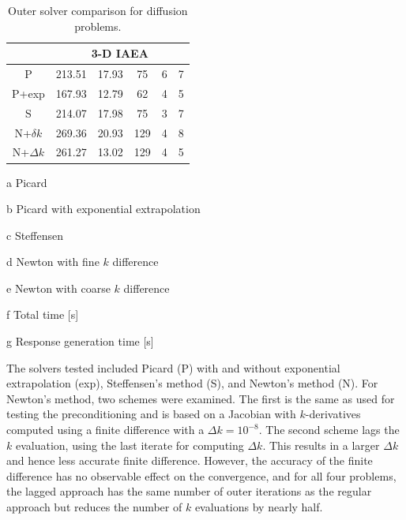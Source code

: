 \begin{table}[!]
\begin{center}
\begin{threeparttable}
\begin{tabular}{cccccc}
 \midrule 
 &  \multicolumn{5}{c}{3-D IAEA} \\ 
 \midrule 
        P &    213.51 &     17.93 &           75 &            6 &            7 \\ 
    P+exp &    167.93 &     12.79 &           62 &            4 &            5 \\ 
    S &    214.07 &     17.98 &           75 &            3 &            7 \\ 
  N+$\delta k$ &    269.36 &     20.93 &          129 &            4 &            8 \\ 
  N+$\Delta k$ &    261.27 &     13.02 &          129 &            4 &            5 \\ 
 \bottomrule 
 \end{tabular} 

 {\footnotesize
 \begin{tablenotes}
   \item[a] Picard 
   \item[b] Picard with exponential extrapolation
   \item[c] Steffensen
   \item[d] Newton with fine $k$ difference
   \item[e] Newton with coarse $k$ difference
   \item[f] Total time [s]
   \item[g] Response generation time [s]
 \end{tablenotes}
 }
 \end{threeparttable}
 
 \end{center} 
 
 \caption{Outer solver comparison for diffusion problems.} 
 \label{tbl:diffusion_outer_study} 
 
\end{table} 


The solvers tested included Picard (P) with and without exponential 
extrapolation (exp), Steffensen's method (S), and Newton's method (N).
For Newton's method, two schemes were examined.  The first is the same 
as used for testing the preconditioning and is based on a Jacobian with 
$k$-derivatives computed using a finite difference 
with a $\Delta k = 10^{-8}$.
The second scheme 
lags the $k$ evaluation, using the last iterate 
for computing $\Delta k$.  This results in a larger $\Delta k$ and hence 
less accurate finite difference.  However, the accuracy of the finite 
difference has no observable effect on the convergence, 
and for all four problems,
the lagged approach has the same number of outer iterations as the 
regular approach but reduces the number of $k$ evaluations by nearly half.

